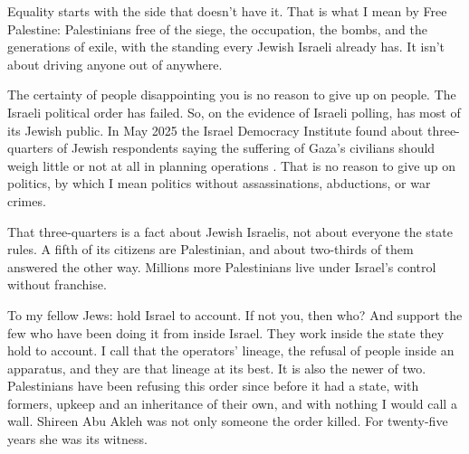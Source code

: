 Equality starts with the side that doesn't have it. That is what I mean by Free Palestine: Palestinians free of the siege, the occupation, the bombs, and the generations of exile, with the standing every Jewish Israeli already has. It isn't about driving anyone out of anywhere.

The certainty of people disappointing you is no reason to give up on people. The Israeli political order has failed. So, on the evidence of Israeli polling, has most of its Jewish public. In May 2025 the Israel Democracy Institute found about three-quarters of Jewish respondents saying the suffering of Gaza's civilians should weigh little or not at all in planning operations \autocite{idi2025may}. That is no reason to give up on politics, by which I mean politics without assassinations, abductions, or war crimes.

That three-quarters is a fact about Jewish Israelis, not about everyone the state rules. A fifth of its citizens are Palestinian, and about two-thirds of them answered the other way. Millions more Palestinians live under Israel's control without franchise.

To my fellow Jews: hold Israel to account. If not you, then who? And support the few who have been doing it from inside Israel. They work inside the state they hold to account. I call that the operators' lineage, the refusal of people inside an apparatus, and they are that lineage at its best. It is also the newer of two. Palestinians have been refusing this order since before it had a state, with formers, upkeep and an inheritance of their own, and with nothing I would call a wall. Shireen Abu Akleh was not only someone the order killed. For twenty-five years she was its witness.

